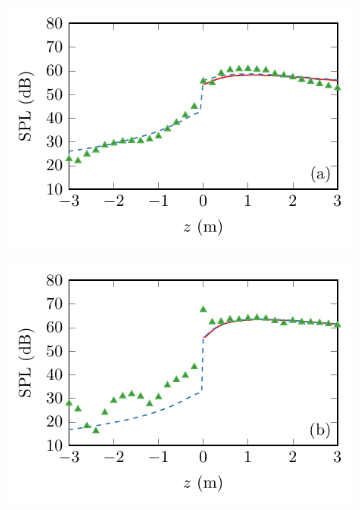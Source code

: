 \begin{figure}[h]
    \centering
    \begin{subfigure}{0.49\textwidth}
        \centering
        \includegraphics[width = \textwidth]{fig/CompareAxisPrs_315Hz.pdf}
    \end{subfigure}
    \begin{subfigure}{0.49\textwidth}
        \centering
        \includegraphics[width = \textwidth]{fig/CompareAxisPrs_500Hz.pdf}
    \end{subfigure}
    \\
    \begin{subfigure}{0.49\textwidth}
        \centering

\end{subfigure}
\end{figure}
